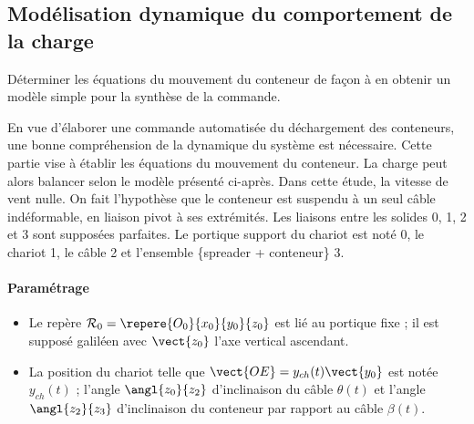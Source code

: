 \def\columnseprulecolor{\color{ocre}}
\setlength{\columnseprule}{0.4pt} 


\setcounter{exo}{0}



\ifprof
\else
\begin{multicols}{2}
\fi

\subsection*{Modélisation dynamique du comportement de la charge}

\begin{obj}
Déterminer les équations du mouvement du conteneur de façon à en obtenir un modèle simple pour
la synthèse de la commande.
\end{obj}

\ifprof
\else
En vue d’élaborer une commande automatisée du déchargement des conteneurs, une bonne compréhension de
la dynamique du système est nécessaire. Cette partie vise à établir les équations du mouvement du conteneur.
La charge peut alors balancer selon le modèle présenté ci-après. Dans cette étude, la vitesse de vent nulle. On fait l'hypothèse que le conteneur est suspendu à un seul câble indéformable, en liaison pivot à ses extrémités. Les liaisons entre les solides 0, 1, 2 et 3 sont supposées parfaites.
Le portique support du chariot est noté 0, le chariot 1, le câble 2 et l’ensemble \{spreader + conteneur\} 3.

\paragraph*{Paramétrage}
\begin{itemize}
\item Le repère $\mathcal{R}_0=\repere{O_0}{x_0}{y_0}{z_0}$ est lié au portique fixe ; il est supposé
galiléen avec $\vect{z_0}$ l’axe vertical ascendant.
\item La position du chariot telle que $\vect{OE} = y_{ch}(t) \vect{y_0}$ est notée $y_{ch}(t)$ ;
l’angle $\angl{z_0}{z_2}$ d’inclinaison du câble $\theta(t)$ et l’angle $\angl{z_2}{z_3}$ d’inclinaison
du conteneur par rapport au câble  $\beta(t)$.
\end{itemize}



\end{multicols}
